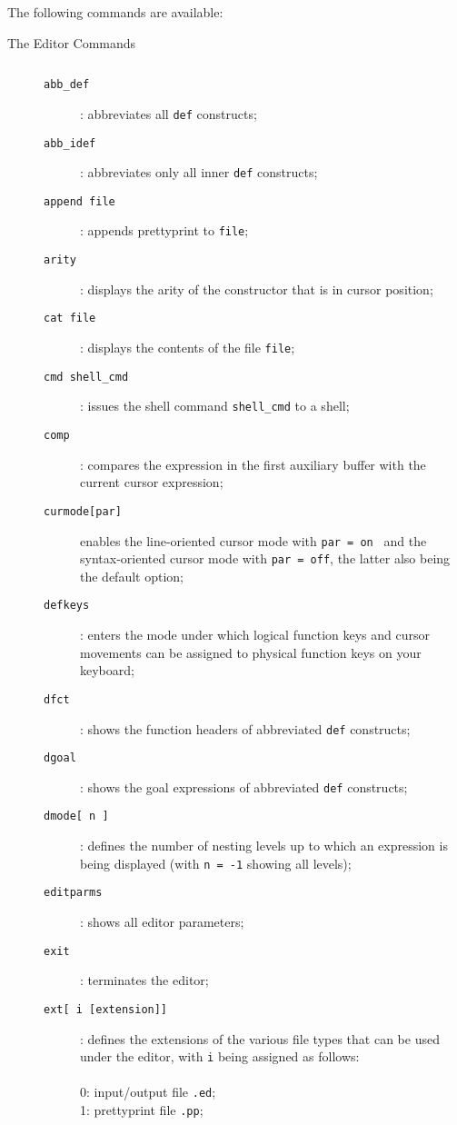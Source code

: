 \begin{description}
The following commands are available:
\\
\begin{description}

\item[{\rm The Editor Commands}] $\;$\\
\begin{description}
\item[{\tt abb\_def}]: abbreviates all {\tt def} constructs;
\item[{\tt abb\_idef}]: abbreviates only all inner {\tt def} constructs;
\item[{\tt append file}]: appends prettyprint to {\tt file};
\item[{\tt arity}]: displays the arity of the constructor that is in
cursor position;
\item[{\tt cat file}]: displays the contents of the file {\tt file};
\item[{\tt cmd shell\_cmd}]: issues the shell command {\tt shell\_cmd} to a shell;
\item[{\tt comp}]: compares the expression in the first auxiliary buffer with the current cursor expression;
\item[{\tt curmode[par]}] enables the line-oriented cursor mode with {\tt par = on } and
the syntax-oriented cursor mode with {\tt par = off}, the latter also being the
default option;
\item[{\tt defkeys}]: enters the mode under which logical function keys and cursor movements can be assigned to physical function keys on 
your keyboard;
\item[{\tt dfct}]: shows the function headers of abbreviated {\tt def}
constructs;
\item[{\tt dgoal}]: shows the goal expressions of abbreviated {\tt def}
constructs;
\item[{\tt dmode[ n ]}]: defines the number of nesting levels up to 
which an expression is being displayed (with {\tt n = -1} showing all
 levels);
\item[{\tt editparms}]: shows all editor parameters;
\item[{\tt exit}]: terminates the editor;
\item[{\tt ext[ i [extension]]}]: defines the extensions of the various file types that can be used under the \pired editor, with {\tt i} being assigned as follows:
\\
\\0: input/output file   {\tt .ed};
\\1: prettyprint file    {\tt .pp};

\end{description}
\end{description}
\end{description}
